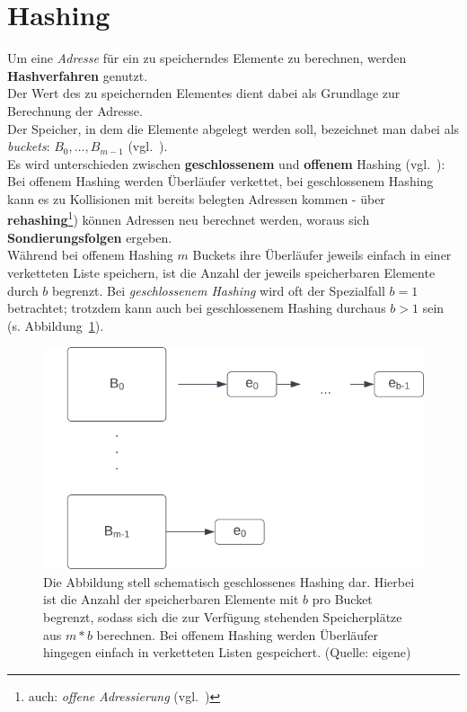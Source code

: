 \section{Hashing}
Um eine \textit{Adresse} für ein zu speicherndes Elemente zu berechnen, werden \textbf{Hashverfahren} genutzt.\\
Der Wert des zu speichernden Elementes dient dabei als Grundlage zur Berechnung der Adresse.\\
Der Speicher, in dem die Elemente abgelegt werden soll, bezeichnet man dabei als \textit{buckets}: $B_0,\dots , B_{m - 1}$ (vgl.~\cite[115]{GD18d}).\\

\noindent
Es wird unterschieden zwischen \textbf{geschlossenem} und \textbf{offenem} Hashing (vgl.~\cite[116]{GD18d}): Bei offenem Hashing werden Überläufer verkettet, bei geschlossenem Hashing kann es zu Kollisionen mit bereits belegten Adressen kommen - über \textbf{rehashing}\footnote{
auch: \textit{offene Adressierung} (vgl.~\cite[119]{GD18d})
}) können Adressen neu berechnet werden, woraus sich \textbf{Sondierungsfolgen} ergeben.\\

\noindent
Während bei offenem Hashing $m$ Buckets ihre Überläufer jeweils einfach in einer verketteten Liste speichern, ist die Anzahl der jeweils speicherbaren Elemente durch $b$ begrenzt.
Bei \textit{geschlossenem Hashing} wird oft der Spezialfall $b = 1$ betrachtet; trotzdem kann auch bei geschlossenem Hashing durchaus $b > 1$ sein (s. Abbildung~\ref{fig:openaddressing}).\\

\begin{figure}
\begin{center}
\includegraphics[scale=0.4]{chapters/Datenstrukturen und Algorithmen/img/openaddressing}
\caption{Die Abbildung stell schematisch geschlossenes Hashing dar. Hierbei ist die Anzahl der speicherbaren Elemente mit $b$ pro Bucket begrenzt, sodass sich die zur Verfügung stehenden Speicherplätze aus $m * b$ berechnen. Bei offenem Hashing werden Überläufer hingegen einfach in verketteten Listen gespeichert. (Quelle: eigene)}
\label{fig:openaddressing}
\end{center}
\end{figure}

